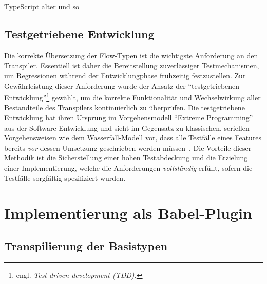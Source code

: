 TypeScript alter und so

\subsection{Testgetriebene Entwicklung}

Die korrekte Übersetzung der Flow-Typen ist die wichtigste Anforderung an den Transpiler. Essentiell ist daher die Bereitstellung zuverlässiger Testmechanismen, um Regressionen während der Entwicklungphase frühzeitig festzustellen. Zur Gewährleistung dieser Anforderung wurde der Ansatz der \enquote{testgetriebenen Entwicklung}\footnote{engl. \textit{Test-driven development (TDD).}} gewählt, um die korrekte Funktionalität und Wechselwirkung aller Bestandteile des Transpilers kontinuierlich zu überprüfen. Die testgetriebene Entwicklung hat ihren Ursprung im Vorgehensmodell \enquote{Extreme Programming}~\autocite{JEFFRIES:EXTREME_PROGRAMMING} aus der Software-Entwicklung und sieht im Gegensatz zu klassischen, seriellen Vorgehensweisen wie dem Wasserfall-Modell vor, dass alle Testfälle eines Features bereits \emph{vor} dessen Umsetzung geschrieben werden müssen~\autocite{KENT:EXTREME_PROGRAMMING}. Die Vorteile dieser Methodik ist die Sicherstellung einer hohen Testabdeckung und die Erzielung einer Implementierung, welche die Anforderungen \emph{vollständig} erfüllt, sofern die Testfälle sorgfältig spezifiziert wurden.







\section{Implementierung als Babel-Plugin}
  \subsection{Transpilierung der Basistypen}
